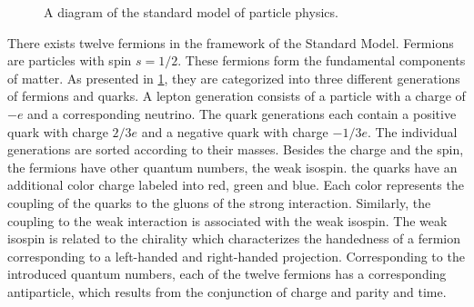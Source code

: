 \documentclass[12pt, a4paper]{thesis}
\begin{document}
\begin{figure}[hbtp]
  \caption{A diagram of the standard model of particle physics.}
  \label{standarmodel}
\end{figure}

There exists twelve fermions in the framework of the Standard
Model. Fermions are particles with spin \(s = 1/2\). These fermions
form the fundamental components of matter. As presented in
\ref{standarmodel}, they are categorized into three different
generations of fermions and quarks. A lepton generation consists of a
particle with a charge of \(-e\) and a corresponding neutrino. The
quark generations each contain a positive quark with charge \(2/3 e\)
and a negative quark with charge \(- 1/3 e\). The individual
generations are sorted according to their masses. Besides the charge
and the spin, the fermions have other quantum numbers, the weak
isospin. the quarks have an additional color charge labeled into red,
green and blue. Each color represents the coupling of the quarks to
the gluons of the strong interaction. Similarly, the coupling to the
weak interaction is associated with the weak isospin. The weak isospin
is related to the chirality which characterizes the handedness of a
fermion corresponding to a left-handed and right-handed
projection. Corresponding to the introduced quantum numbers, each of
the twelve fermions has a corresponding antiparticle, which results
from the conjunction of charge and parity and time.
\end{document}
